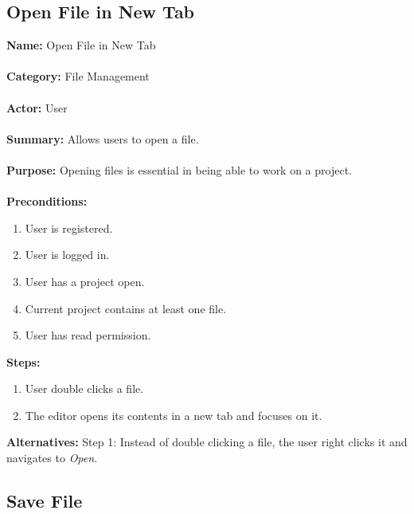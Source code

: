 \documentclass[14pt, a4paper]{article}
\begin{document}
\newpage

\subsection{Open File in New Tab}

\begin{framed}
	\noindent\textbf{Name:} Open File in New Tab \\ \\
	\textbf{Category:} File Management \\ \\
	\textbf{Actor:} User \\ \\
	\textbf{Summary:} Allows users to open a file. \\ \\
	\textbf{Purpose:} Opening files is essential in being able to work on a project. \\ \\
	\textbf{Preconditions:} 
	\begin{enumerate}
		\item User is registered.
		\item User is logged in.
		\item User has a project open.
		\item Current project contains at least one file.
		\item User has read permission.
	\end{enumerate}		
	\textbf{Steps:}
	\begin{enumerate}
		\item User double clicks a file.
		\item The editor opens its contents in a new tab and focuses on it.
	\end{enumerate}	
	\textbf{Alternatives:} Step 1: Instead of double clicking a file, the user right clicks it and navigates to \textit{Open}.
\end{framed}

\newpage

\subsection{Save File}
\end{document}
